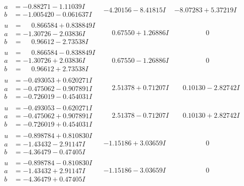 \documentclass[1p]{elsarticle_modified}
\theoremstyle{definition}
\begin{document}
$$\begin{array}{c|c|c}
\begin{aligned}
a &= -0.88271 - 1.11039 I \\
b &= -1.005420 - 0.061637 I\end{aligned}
 & -4.20156 - 8.41815 I & -8.07283 + 5.37219 I \\ \hline\begin{aligned}
u &= \phantom{-}0.866584 + 0.838849 I \\
a &= -1.30726 - 2.03836 I \\
b &= \phantom{-}0.96612 - 2.73538 I\end{aligned}
 & \phantom{-}0.67550 + 1.26886 I & \phantom{-0.000000 } 0 \\ \hline\begin{aligned}
u &= \phantom{-}0.866584 - 0.838849 I \\
a &= -1.30726 + 2.03836 I \\
b &= \phantom{-}0.96612 + 2.73538 I\end{aligned}
 & \phantom{-}0.67550 - 1.26886 I & \phantom{-0.000000 } 0 \\ \hline\begin{aligned}
u &= -0.493053 + 0.620271 I \\
a &= -0.475062 - 0.907891 I \\
b &= -0.726019 - 0.454031 I\end{aligned}
 & \phantom{-}2.51378 + 0.71207 I & \phantom{-}0.10130 - 2.82742 I \\ \hline\begin{aligned}
u &= -0.493053 - 0.620271 I \\
a &= -0.475062 + 0.907891 I \\
b &= -0.726019 + 0.454031 I\end{aligned}
 & \phantom{-}2.51378 - 0.71207 I & \phantom{-}0.10130 + 2.82742 I \\ \hline\begin{aligned}
u &= -0.898784 + 0.810830 I \\
a &= -1.43432 - 2.91147 I \\
b &= -4.36479 - 0.47405 I\end{aligned}
 & -1.15186 + 3.03659 I & \phantom{-0.000000 } 0 \\ \hline\begin{aligned}
u &= -0.898784 - 0.810830 I \\
a &= -1.43432 + 2.91147 I \\
b &= -4.36479 + 0.47405 I\end{aligned}
 & -1.15186 - 3.03659 I & \phantom{-0.000000 } 0 \\ \hline\begin{aligned}

\end{aligned}
\end{array}$$
\end{document}

